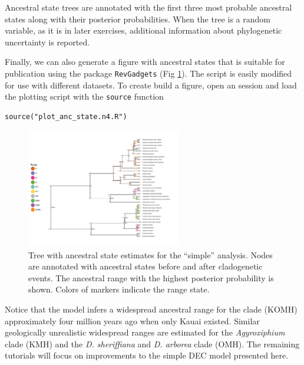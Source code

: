 Ancestral state trees are annotated with the first three most probable ancestral states along with their posterior probabilities.
When the tree is a random variable, as it is in later exercises, additional information about phylogenetic uncertainty is reported.

Finally, we can also generate a figure with ancestral states that is suitable for publication using the \R package {\tt RevGadgets} (Fig \ref{fig:simple_RevGadgets_ase}).
The script is easily modified for use with different datasets.
To create build a figure, open an \R session and load the plotting script with the {\tt source} function
\begin{snugshade}
\begin{lstlisting}
source("plot_anc_state.n4.R")
\end{lstlisting}
\end{snugshade}

\begin{figure}[!ht]
\centering
\includegraphics[width=0.6\textwidth]{figures/fig_simple_RevGadgets_ase.pdf}
\caption{Tree with ancestral state estimates for the ``simple'' analysis. Nodes are annotated with ancestral states before and after cladogenetic events. The ancestral range with the highest posterior probability is shown. Colors of markers indicate the range state.}
\label{fig:simple_RevGadgets_ase}
\end{figure}

Notice that the model infers a widespread ancestral range for the clade (KOMH) approximately four million years ago when only Kauai existed.
Similar geologically unrealistic widespread ranges are estimated for the {\it Agyroxiphium} clade (KMH) and the {\it D. sheriffiana} and {\it D. arborea} clade (OMH).
The remaining tutorials will focus on improvements to the simple DEC model presented here.

\newpage
